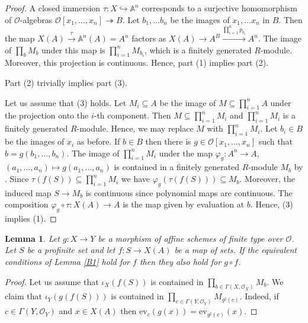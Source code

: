 \documentclass{amsart}
\newtheorem{lem}[prop]{Lemma}
\theoremstyle{definition}
\theoremstyle{remark}
\newcommand{\ev}{\mathrm{ev}}
\newcommand{\OO}{\mathcal O}
\begin{document}
\begin{proof} A closed immersion $\tau: X\hookrightarrow \mathbb A^n$ corresponds 
to a surjective homomorphism of $\OO$-algebras $\OO[x_1, \ldots, x_n]\twoheadrightarrow B$. 
Let $b_1, \ldots b_n$ be the images of $x_1, \ldots x_n$ in $B$.  Then the map 
$ X(A) \overset{\tau}{\longrightarrow} \mathbb A^n(A)=A^n$ factors as 
$X(A) \rightarrow A^B \overset{\prod_{i=1}^n p_{b_i}}{\longrightarrow} A^n$. 
The image of $\prod_{b} M_b$ under this 
map is $\prod_{i=1}^n M_{b_i}$, which is a finitely generated $R$-module. Moreover, this projection 
is continuous. Hence, part (1) implies part (2).

Part (2) trivially implies part (3). 

Let us assume that (3) holds. Let $M_i \subseteq A$ be the image of $M \subseteq \prod_{i=1}^n A$ 
under the projection onto the $i$-th component. Then $M \subseteq \prod_{i=1}^n M_i$ and 
$\prod_{i=1}^n M_i$ is a finitely generated $R$-module. Hence, we may replace $M$ with $\prod_{i=1}^n M_i$.
Let $b_i\in B$ be the images of $x_i$ as before. If $b\in B$ then there is $g\in \OO[x_1, \ldots, x_n]$
such that $b= g(b_1, \ldots, b_n)$. The image of $\prod_{i=1}^n M_i$ under the map 
$\varphi_g: A^n \rightarrow A$, $(a_1, \ldots, a_n) \mapsto g(a_1, \ldots, a_n)$ is contained in a finitely generated 
$R$-module $M_b$ by   . Since $\tau(f(S)) \subseteq \prod_{i=1}^n M_i$ 
we have $\varphi_g(\tau(f(S))) \subseteq M_b$. Moreover,  
the induced map $S\rightarrow M_b$ is continuous since polynomial maps are continuous.
The composition 
$\varphi_g \circ \tau: X(A) \rightarrow A$ is the map given by evaluation at $b$. Hence, (3) implies (1). 
\end{proof}



\begin{lem}\label{B2} Let $g: X\rightarrow Y$ be a morphism of affine schemes of finite type over $\OO$. Let $S$ be a profinite set and let $f: S\rightarrow X(A)$ be a map of sets. 
If the equivalent conditions of Lemma \ref{B1} hold for $f$ then they also hold for $g\circ f$.
\end{lem}

\begin{proof} Let us assume that $\iota_X(f(S))$ is contained in $\prod_{b\in \Gamma(X, \OO_X)} M_b$. 
We claim that $\iota_Y(g (f(S)))$ is contained in $\prod_{c\in \Gamma(Y, \OO_Y)} M_{g^{\sharp}(c)}$. Indeed, 
if $c\in \Gamma(Y, \OO_Y)$ and $x\in X(A)$ then $\ev_c ( g(x)) = \ev_{g^{\sharp}(c)}(x)$.
\end{proof}
\end{document}
